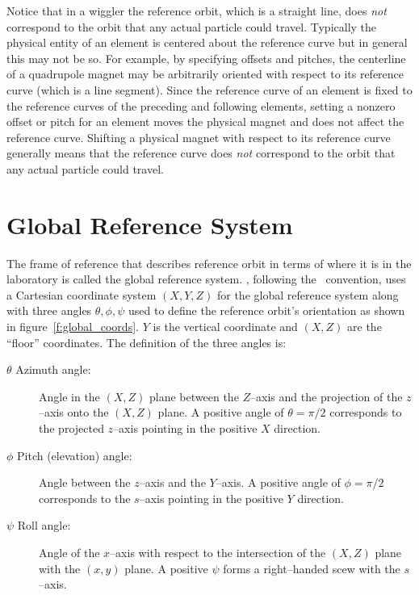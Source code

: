 Notice that in a wiggler the reference orbit, which is a straight
line, does {\em not} correspond to the orbit that any actual particle
could travel. Typically the physical entity of an element is centered
about the reference curve but in general this may not be so. For
example, by specifying offsets and pitches, the centerline of a
quadrupole magnet may be arbitrarily oriented with respect to its
reference curve (which is a line segment). Since the reference curve
of an element is fixed to the reference curves of the preceding and
following elements, setting a nonzero offset or pitch for an element
moves the physical magnet and does not affect the reference
curve. Shifting a physical magnet with respect to its reference curve
generally means that the reference curve does {\em not} correspond to
the orbit that any actual particle could travel.


\section{Global Reference System}

The frame of reference that describes reference orbit in terms of where it
is in the laboratory is called the global reference system.
\bmad, following the \mad\ convention, uses a Cartesian coordinate system
$(X, Y, Z)$ for the global reference system along with three angles
$\theta, \phi, \psi$ used to define the reference orbit's orientation
as shown in figure~\ref{f:global_coords}. $Y$ is the vertical
coordinate and $(X, Z)$ are the ``floor'' coordinates.  The definition
of the three angles is:
\begin{description}
\item[$\theta$ Azimuth angle:] Angle in the $(X, Z)$ plane 
between the $Z$--axis and the projection of the $z$--axis onto the
$(X, Z)$ plane. A positive angle of $\theta = \pi/2$ corresponds to the
projected $z$--axis pointing in the positive $X$ direction.
\item[$\phi$ Pitch (elevation) angle:] Angle between the $z$--axis 
and the $Y$--axis. A positive angle of $\phi = \pi/2$ corresponds to
the $s$--axis pointing in the positive $Y$ direction.
\item[$\psi$ Roll angle:] Angle of the $x$--axis with respect 
to the intersection of the $(X, Z)$ plane with the $(x, y)$ plane. A
positive $\psi$ forms a right--handed scew with the $s$--axis.
\end{description}

